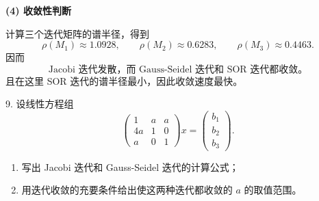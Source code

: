 \documentclass[11pt, a4paper]{ctexart}
\begin{document}
\begin{solution}
    \textbf{(4) 收敛性判断}

    计算三个迭代矩阵的谱半径，得到
    \[
        \rho(M_1) \approx 1.0928,\qquad
        \rho(M_2) \approx 0.6283,\qquad
        \rho(M_3) \approx 0.4463.
    \]
    因而
    \[
        \boxed{\text{Jacobi 迭代发散，而 Gauss-Seidel 迭代和 SOR 迭代都收敛。}}
    \]
    且在这里 SOR 迭代的谱半径最小，因此收敛速度最快。
\end{solution}


\begin{problem}{9. 设线性方程组}
    \[
        \begin{pmatrix}
            1 & a & a \\
            4a & 1 & 0 \\
            a & 0 & 1
        \end{pmatrix}
        x
        =
        \begin{pmatrix}
            b_1 \\
            b_2 \\
            b_3
        \end{pmatrix}.
    \]
    \begin{enumerate}[1.]
        \item 写出 Jacobi 迭代和 Gauss-Seidel 迭代的计算公式；
        \item 用迭代收敛的充要条件给出使这两种迭代都收敛的 $a$ 的取值范围。
    \end{enumerate}
\end{problem}
\end{document}
